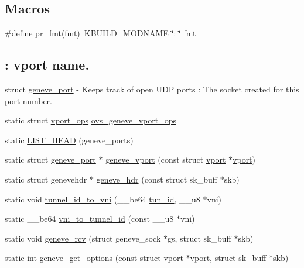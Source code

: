 \subsection*{Macros}
\begin{DoxyCompactItemize}
\item 
\#define \hyperlink{vport-geneve_8c_a1f8c165bf4196327bc3abff648276d92}{pr\+\_\+fmt}(fmt)~K\+B\+U\+I\+L\+D\+\_\+\+M\+O\+D\+N\+A\+M\+E \char`\"{}\+: \char`\"{} fmt
\end{DoxyCompactItemize}
\subsection*{\+: vport name.}
\label{_amgrp11b33af0c85e2c8a3c03b696f666e431}%
struct \hyperlink{structgeneve__port}{geneve\+\_\+port} -\/ Keeps track of open U\+D\+P ports \+: The socket created for this port number. \begin{DoxyCompactItemize}
\item 
static struct \hyperlink{structvport__ops}{vport\+\_\+ops} \hyperlink{vport-geneve_8c_ad9b8555c118ad2e5874c3ab931390752}{ovs\+\_\+geneve\+\_\+vport\+\_\+ops}
\item 
static \hyperlink{vport-geneve_8c_aa66e082c97d7820eb9eb166e6cf4b996}{L\+I\+S\+T\+\_\+\+H\+E\+A\+D} (geneve\+\_\+ports)
\item 
static struct \hyperlink{structgeneve__port}{geneve\+\_\+port} $\ast$ \hyperlink{vport-geneve_8c_aa51b640340c7d2eaf45af423bc1e0931}{geneve\+\_\+vport} (const struct \hyperlink{structvport}{vport} $\ast$\hyperlink{structvport}{vport})
\item 
static struct genevehdr $\ast$ \hyperlink{vport-geneve_8c_ae7668c9c0c48969a65fdcc4ba3a31b6c}{geneve\+\_\+hdr} (const struct sk\+\_\+buff $\ast$skb)
\item 
static void \hyperlink{vport-geneve_8c_a50b7591d7d9bf380d0f2899042668880}{tunnel\+\_\+id\+\_\+to\+\_\+vni} (\+\_\+\+\_\+be64 \hyperlink{flow_8h_aba5027d7a3d96f0f58dd8e607365934b}{tun\+\_\+id}, \+\_\+\+\_\+u8 $\ast$vni)
\item 
static \+\_\+\+\_\+be64 \hyperlink{vport-geneve_8c_a1a4714395c3a408973e64b315af6ac35}{vni\+\_\+to\+\_\+tunnel\+\_\+id} (const \+\_\+\+\_\+u8 $\ast$vni)
\item 
static void \hyperlink{vport-geneve_8c_a0266c855cef0a46188e7bf48485171c4}{geneve\+\_\+rcv} (struct geneve\+\_\+sock $\ast$gs, struct sk\+\_\+buff $\ast$skb)
\item 
static int \hyperlink{vport-geneve_8c_a08a891b83a07b3300134c1340f329e84}{geneve\+\_\+get\+\_\+options} (const struct \hyperlink{structvport}{vport} $\ast$\hyperlink{structvport}{vport}, struct sk\+\_\+buff $\ast$skb)

\end{DoxyCompactItemize}
